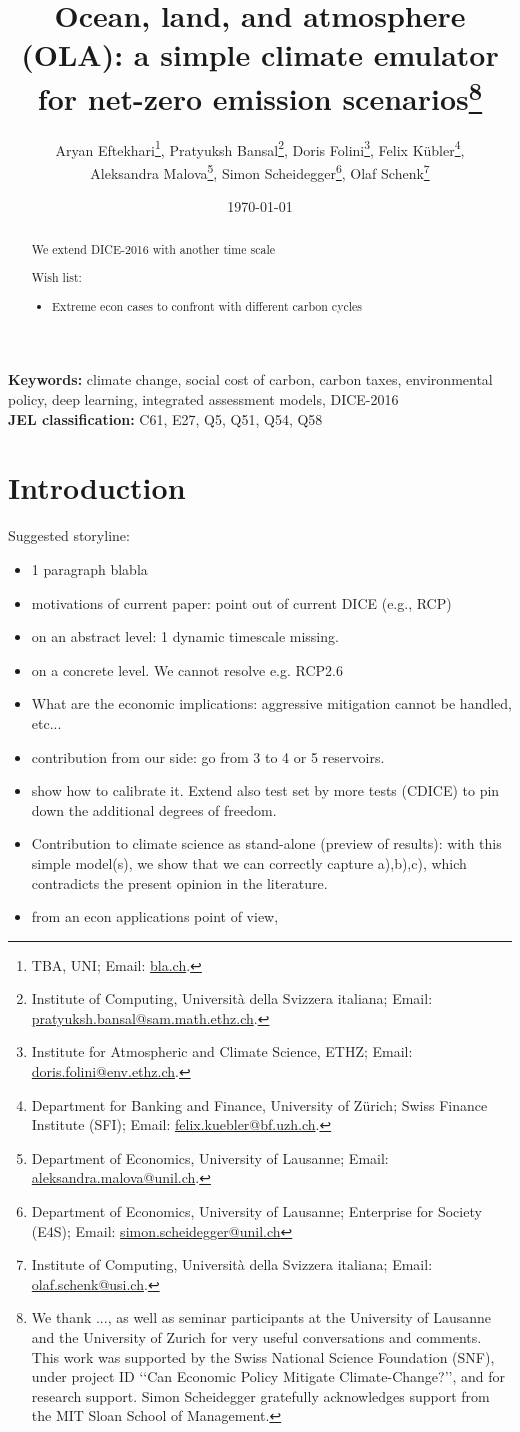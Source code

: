 \documentclass[11pt, a4paper, pdftex, twoside, dvipsnames]{article}
\title{Ocean, land, and atmosphere (OLA): a simple climate emulator for net-zero emission scenarios\thanks{We thank ..., as well as seminar participants at the University of Lausanne and the University of Zurich for very useful conversations and comments. This work was supported by the Swiss National Science Foundation (SNF), under project ID  \lq\lq Can Economic Policy Mitigate Climate-Change?\rq\rq, and for research support. Simon Scheidegger gratefully acknowledges support from the MIT Sloan School of Management.}}
\author{
    Aryan Eftekhari\thanks{TBA, UNI; Email:
    \href{mailto:bla}{bla.ch}.}, \;
    Pratyuksh Bansal\thanks{Institute of Computing, Universit\`a della Svizzera italiana; Email:
    \href{mailto:pratyuksh.bansal@sam.math.ethz.ch}{pratyuksh.bansal@sam.math.ethz.ch}.}, \;
    Doris Folini\thanks{Institute for Atmospheric and Climate Science, ETHZ; Email:
    \href{mailto:doris.folini@env.ethz.ch}{doris.folini@env.ethz.ch}.}, \;
  Felix K\"ubler\thanks{Department for Banking and Finance, University of Z\"urich; Swiss Finance Institute (SFI); Email: \href{mailto:fkubler@gmail.com}{felix.kuebler@bf.uzh.ch}.}, \\ \;
  Aleksandra Malova\thanks{Department of Economics, University of Lausanne; Email: \href{mailto:malova.alex@unil.ch}{aleksandra.malova@unil.ch}.}, \; 
  Simon Scheidegger\thanks{Department of Economics, University of Lausanne; Enterprise for Society (E4S); Email: \href{mailto:simon.scheidegger@unil.ch}{simon.scheidegger@unil.ch}}, \;
  Olaf Schenk\thanks{Institute of Computing, Universit\`a della Svizzera italiana; Email: \href{mailto:olaf.schenk@usi.ch}{olaf.schenk@usi.ch}.}
  }
\date{\today}
\begin{document}
\maketitle

\begin{abstract}
 We extend DICE-2016 with another time scale
 
 Wish list:
 \begin{itemize}
     \item Extreme econ cases to confront with different carbon cycles
 \end{itemize}

  \end{abstract}

{\small {\bf Keywords:} climate change, social cost of carbon, carbon taxes, environmental policy, deep learning, integrated assessment models, DICE-2016} \\

{\small {\bf JEL classification:} C61, E27, Q5, Q51, Q54, Q58} 



\newpage
\tableofcontents

\newpage

%
\section{Introduction}
\label{sec:intro}
%
Suggested storyline:
\begin{itemize}
    \item 1 paragraph blabla
    \item motivations of current paper: point out of current DICE (e.g., RCP)
    \item on an abstract level: 1 dynamic timescale missing.
    \item on a concrete level. We cannot resolve e.g. RCP2.6
    \item What are the economic implications: aggressive mitigation cannot be handled, etc...
    \item contribution from our side: go from 3 to 4 or 5 reservoirs.
    \item show how to calibrate it. Extend also test set by more tests (CDICE) to pin down the additional degrees of freedom.
    \item Contribution to climate science as stand-alone (preview of results): with this simple model(s), we show that we can correctly capture a),b),c), which contradicts the present opinion in the literature.
    \item from an econ applications point of view, 
\end{itemize}
\end{document}
